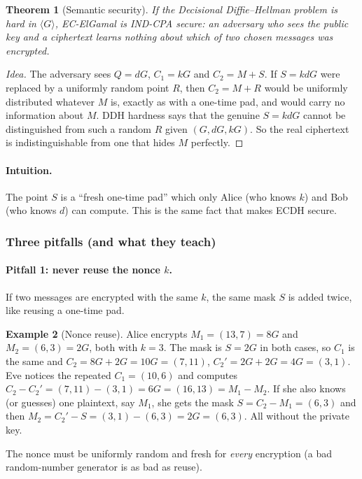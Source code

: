 \documentclass[11pt,a4paper,oneside]{book}
\theoremstyle{plain}
\newtheorem{theorem}{Theorem}[chapter]
\theoremstyle{definition}
\newtheorem{example}[theorem]{Example}
\theoremstyle{remark}
\begin{document}
\begin{theorem}[Semantic security]
If the Decisional Diffie--Hellman problem is hard in $\langle G\rangle$, EC-ElGamal is IND-CPA secure: an adversary who sees the public key and a ciphertext learns nothing about which of two chosen messages was encrypted.
\end{theorem}
\begin{proof}[Idea]
The adversary sees $Q=dG$, $C_1=kG$ and $C_2=M+S$. If $S=kdG$ were replaced by a uniformly random point $R$, then $C_2=M+R$ would be uniformly distributed whatever $M$ is, exactly as with a one-time pad, and would carry no information about $M$. DDH hardness says that the genuine $S=kdG$ cannot be distinguished from such a random $R$ given $(G,dG,kG)$. So the real ciphertext is indistinguishable from one that hides $M$ perfectly.
\end{proof}

\paragraph{Intuition.} The point $S$ is a ``fresh one-time pad'' which only Alice (who knows $k$) and Bob (who knows $d$) can compute. This is the same fact that makes ECDH secure.

\subsubsection*{Three pitfalls (and what they teach)}

\paragraph{Pitfall 1: never reuse the nonce $k$.}
If two messages are encrypted with the same $k$, the same mask $S$ is added twice, like reusing a one-time pad.
\begin{example}[Nonce reuse]
Alice encrypts $M_1=(13,7)=8G$ and $M_2=(6,3)=2G$, both with $k=3$. The mask is $S=2G$ in both cases, so $C_1$ is the same and
$C_2=8G+2G=10G=(7,11)$, $C_2'=2G+2G=4G=(3,1)$.
Eve notices the repeated $C_1=(10,6)$ and computes $C_2-C_2'=(7,11)-(3,1)=6G=(16,13)=M_1-M_2$. If she also knows (or guesses) one plaintext, say $M_1$, she gets the mask $S=C_2-M_1=(6,3)$ and then $M_2=C_2'-S=(3,1)-(6,3)=2G=(6,3)$. All without the private key.
\end{example}
The nonce must be uniformly random and fresh for \emph{every} encryption (a bad random-number generator is as bad as reuse).
\end{document}
